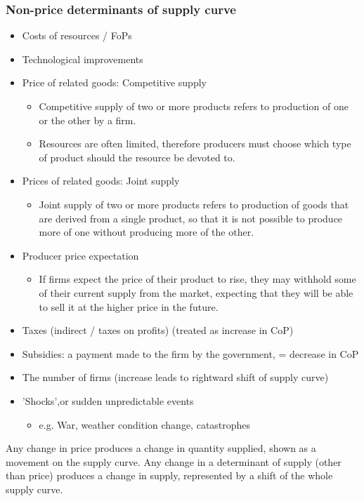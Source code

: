 \documentclass[a4paper,12pt]{article}
\begin{document}
\subsubsection*{Non-price determinants of supply curve}
\begin{itemize}
  \item Costs of resources / FoPs
  \item Technological improvements
  \item Price of related goods: Competitive supply
  \begin{itemize}
    \item Competitive supply of two or more products refers to production of one or the other by a firm.
    \item Resources are often limited, therefore producers must choose which type of product should the resource be devoted to.
  \end{itemize}
  \item Prices of related goods: Joint supply
  \begin{itemize}
    \item Joint supply of two or more products refers to production of goods that are derived from a single product, so that it is not possible to produce more of one without producing more of the other.
  \end{itemize}
  \item Producer price expectation
  \begin{itemize}
    \item If firms expect the price of their product to rise, they may withhold some of their current supply from the market, expecting that they will be able to sell it at the higher price in the future.
  \end{itemize}
  \item Taxes (indirect / taxes on profits) (treated as increase in CoP)
  \item Subsidies: a payment made to the firm by the government, = decrease in CoP
  \item The number of firms (increase leads to rightward shift of supply curve)
  \item 'Shocks',or sudden unpredictable events
  \begin{itemize}
    \item e.g. War, weather condition change, catastrophes
  \end{itemize}
\end{itemize}
Any change in price produces a change in quantity supplied, shown as a movement on the supply curve. Any change in a determinant of supply (other than price) produces a change in supply, represented by a shift of the whole supply curve.
\end{document}
